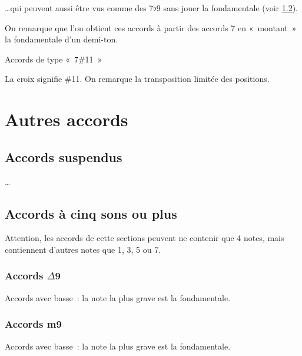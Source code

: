 \documentclass[11pt]{article}
\begin{document}
…qui peuvent aussi être vus comme des 7$\flat$9 sans jouer la fondamentale
(voir \ref{cinq ou plus}).


On remarque que l’on obtient ces accords à partir des accords 7 en
«~montant~» la fondamentale d’un demi-ton.

Accords de type «~7\#11~»


La croix signifie \#11. On remarque la transposition limitée des positions.

\section{Autres accords}

\subsection{Accords suspendus}

\ldots

\subsection{Accords à cinq sons ou plus} \label{cinq ou plus}

Attention, les accords de cette sections peuvent ne contenir que 4 notes,
mais contiennent d’autres notes que 1, 3, 5 ou 7.

\subsubsection{Accords $\Delta$9}

Accords avec basse : la note la plus grave est la fondamentale.


\subsubsection{Accords m9}

Accords avec basse : la note la plus grave est la fondamentale.

\end{document}
